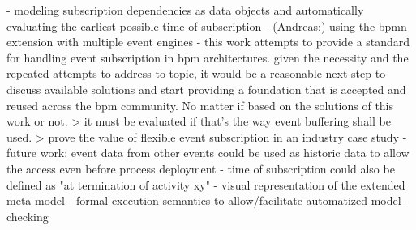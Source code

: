 - modeling subscription dependencies as data objects and automatically evaluating the earliest possible time of subscription
- (Andreas:) using the bpmn extension with multiple event engines
- this work attempts to provide a standard for handling event subscription in bpm architectures. given the necessity and the repeated attempts to address to topic, it would be a reasonable next step to discuss available solutions and start providing a foundation that is accepted and reused across the bpm community. No matter if based on the solutions of this work or not.
> it must be evaluated if that's the way event buffering shall be used. > prove the value of flexible event subscription in an industry case study
- future work: event data from other events could be used as historic data to allow the access even before process deployment
- time of subscription could also be defined as "at termination of activity xy"
- visual representation of the extended meta-model
- formal execution semantics to allow/facilitate automatized model-checking